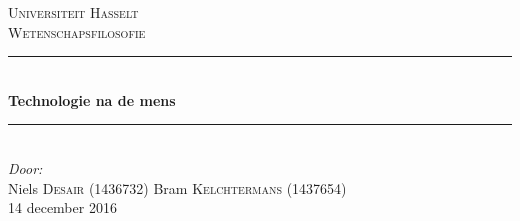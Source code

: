 \begin{titlepage}

\newcommand{\HRule}{\rule{\linewidth}{0.5mm}} %

\center %
 

\textsc{\LARGE Universiteit Hasselt}\\[1.5cm] %
\textsc{\Large Wetenschapsfilosofie}\\[0.5cm] %


\HRule \\[0.4cm]
{ \huge \bfseries Technologie na de mens}\\[0.4cm] %
\HRule \\[0.5cm]
 




\Large \emph{Door:}\\
Niels \textsc{Desair} (1436732)
\linebreak
Bram \textsc{Kelchtermans} (1437654) \\ %


{\large 14 december 2016}\\[1cm] %



\end{titlepage}
